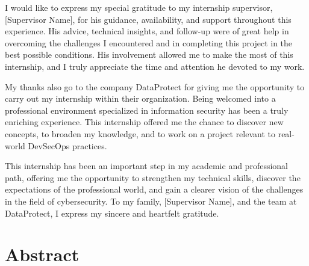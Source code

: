 \documentclass[12pt]{article}
\begin{document}
I would like to express my special gratitude to my internship supervisor,
[Supervisor Name], for his guidance, availability, and support throughout this
experience. His advice, technical insights, and follow-up were of great help in
overcoming the challenges I encountered and in completing this project in the
best possible conditions. His involvement allowed me to make the most of this
internship, and I truly appreciate the time and attention he devoted to my
work.

My thanks also go to the company DataProtect for giving me the opportunity to
carry out my internship within their organization. Being welcomed into a
professional environment specialized in information security has been a truly
enriching experience. This internship offered me the chance to discover new
concepts, to broaden my knowledge, and to work on a project relevant to
real-world DevSecOps practices.

This internship has been an important step in my academic and professional
path, offering me the opportunity to strengthen my technical skills, discover
the expectations of the professional world, and gain a clearer vision of the
challenges in the field of cybersecurity. To my family, [Supervisor Name], and
the team at DataProtect, I express my sincere and heartfelt gratitude.

\newpage

\section*{Abstract}
\end{document}
